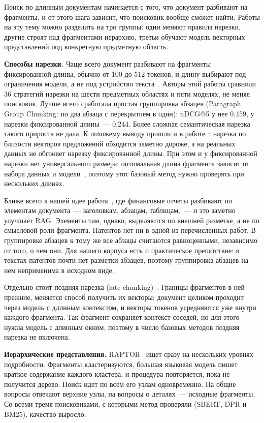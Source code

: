 \documentclass{article}
\begin{document}
Поиск по длинным документам начинается с того, что документ разбивают на фрагменты, и от этого шага зависит, что поисковик вообще сможет найти. Работы на эту тему можно разделить на три группы: одни меняют правила нарезки, другие строят над фрагментами иерархию, третьи обучают модель векторных представлений под конкретную предметную область.

\textbf{Способы нарезки.}
Чаще всего документ разбивают на фрагменты фиксированной длины, обычно от 100 до 512 токенов, и длину выбирают под ограничения модели, а не под устройство текста~\citep{shaukat2026chunking}. Авторы этой работы сравнили 36 стратегий нарезки на шести предметных областях и пяти моделях, не меняя поисковик. Лучше всего сработала простая группировка абзацев (Paragraph Group Chunking: по два абзаца с перекрытием в один): nDCG@5 у нее 0,459, у нарезки фиксированной длины~--- 0,244. Более сложная семантическая нарезка такого прироста не дала. К похожему выводу пришли и в работе~\citep{qu2025semantic}: нарезка по близости векторов предложений обходится заметно дороже, а на реальных данных не обгоняет нарезку фиксированной длины. При этом и у фиксированной нарезки нет универсального размера: оптимальная длина фрагмента зависит от набора данных и модели~\citep{bhat2025chunksize}, поэтому этот базовый метод нужно проверять при нескольких длинах.

Ближе всего к нашей идее работа~\citep{jimenoyepes2024financial}, где финансовые отчеты разбивают по элементам документа~--- заголовкам, абзацам, таблицам,~--- и это заметно улучшает RAG. Элементы там, однако, выделяются по внешней разметке, а не по смысловой роли фрагмента. Патентов нет ни в одной из перечисленных работ. В группировке абзацев к тому же все абзацы считаются равноценными, независимо от того, о чем они. Для нашего корпуса есть и практическое препятствие: в текстах патентов почти нет разметки абзацев, поэтому группировка абзацев на нем неприменима в исходном виде.

Отдельно стоит поздняя нарезка (late chunking)~\citep{gunther2024late}. Границы фрагментов в ней прежние, меняется способ получить их векторы: документ целиком проходит через модель с длинным контекстом, и векторы токенов усредняются уже внутри каждого фрагмента. Так фрагмент сохраняет контекст соседей, но для этого нужна модель с длинным окном, поэтому в число базовых методов поздняя нарезка не включена.

\textbf{Иерархические представления.}
RAPTOR~\citep{sarthi2024raptor} ищет сразу на нескольких уровнях подробности. Фрагменты кластеризуются, большая языковая модель пишет краткое содержание каждого кластера, и процедура повторяется, пока не получится дерево. Поиск идет по всем его узлам одновременно. На общие вопросы отвечают верхние узлы, на вопросы о деталях~--- исходные фрагменты. Со всеми тремя поисковиками, с которыми метод проверяли (SBERT, DPR и BM25), качество выросло.
\end{document}
